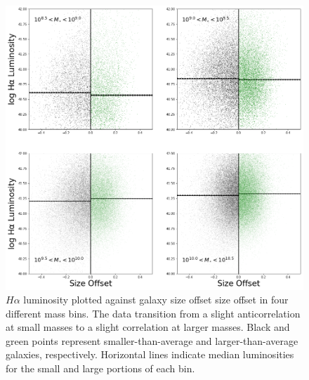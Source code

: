\documentclass[iop]{emulateapj}
\begin{document}
\begin{figure}
	\centering
	\includegraphics[width=1.5 \columnwidth]{ha_lum_2x2.png}
	\caption{$H\alpha$ luminosity plotted against galaxy size offset size offset in four different mass bins. The data transition from a slight anticorrelation at small masses to a slight correlation at larger masses. Black and green points represent smaller-than-average and larger-than-average galaxies, respectively. Horizontal lines indicate median luminosities for the small and large portions of each bin.}
     \label{fig:HA_lum}

\end{figure}
\end{document}
